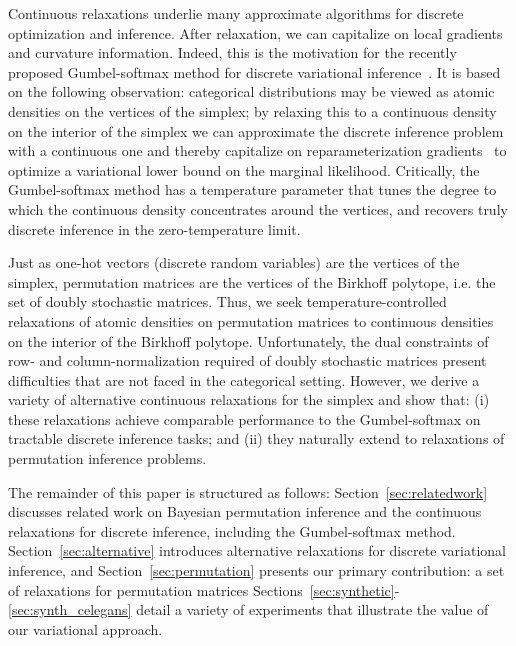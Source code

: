 Continuous relaxations underlie many approximate algorithms for
discrete optimization and inference.  After relaxation, we can
capitalize on local gradients and curvature information. Indeed, this
is the motivation for the recently proposed Gumbel-softmax method for
discrete variational inference~\citep{jang2016categorical,
  maddison2016concrete}.  It is based on the following observation:
categorical distributions may be viewed as atomic densities
on the vertices of the simplex; by relaxing this to a continuous
density on the interior of the simplex we can approximate the discrete
inference problem with a continuous one and thereby capitalize on
reparameterization gradients~\citep{Kingma2014, rezende2014stochastic}
to optimize a variational lower bound on the marginal likelihood.
Critically, the Gumbel-softmax method has a temperature parameter that
tunes the degree to which the continuous density concentrates around
the vertices, and recovers truly discrete inference in the
zero-temperature limit.

Just as one-hot vectors (discrete random variables) are the vertices
of the simplex, permutation matrices are the vertices of the Birkhoff
polytope, i.e. the set of doubly stochastic matrices.  Thus, we seek
temperature-controlled relaxations of atomic densities on permutation
matrices to continuous densities on the interior of the Birkhoff
polytope.  Unfortunately, the dual constraints of row- and
column-normalization required of doubly stochastic matrices present
difficulties that are not faced in the categorical setting. However,
we derive a variety of alternative continuous relaxations for the
simplex and show that: (i) these relaxations achieve comparable
performance to the Gumbel-softmax on tractable discrete inference
tasks; and (ii) they naturally extend to relaxations of permutation
inference problems.

The remainder of this paper is structured as follows: Section~\ref{sec:relatedwork}
discusses related work on Bayesian permutation inference and
the continuous relaxations for discrete inference, including the Gumbel-softmax
method. 
Section~\ref{sec:alternative} introduces alternative relaxations for
discrete variational inference, and Section~\ref{sec:permutation} presents
our primary contribution: a set of relaxations for permutation matrices
Sections~\ref{sec:synthetic}-\ref{sec:synth_celegans} detail a variety
of experiments that illustrate the value of our variational approach.
  
